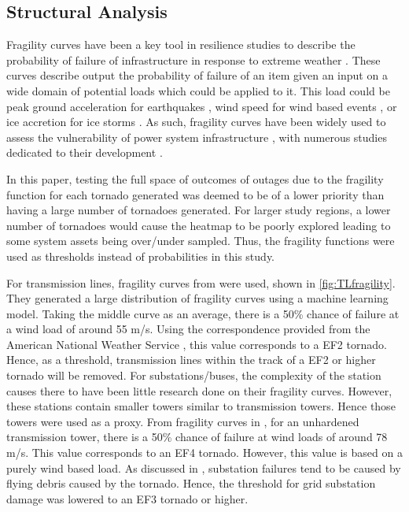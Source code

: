 \documentclass[12pt]{article}
\begin{document}
\subsection{Structural Analysis} \label{FragilityCurve}
Fragility curves have been a key tool in resilience studies to describe the probability of failure of infrastructure in response to extreme weather \cite{serrano2023comprehensive}. These curves describe output the probability of failure of an item given an input on a wide domain of potential loads which could be applied to it. This load could be peak ground acceleration for earthquakes \cite{zekavati2022regional}, wind speed for wind based events \cite{serrano2023comprehensive}, or ice accretion for ice storms \cite{Sheng2023}. As such, fragility curves have been widely used to assess the vulnerability of power system infrastructure \cite{panteli}, with numerous studies dedicated to their development \cite{serrano2023comprehensive}. \par
In this paper, testing the full space of outcomes of outages due to the fragility function for each tornado generated was deemed to be of a lower priority than having a large number of tornadoes generated. For larger study regions, a lower number of tornadoes would cause the heatmap to be poorly explored leading to some system assets being over/under sampled. Thus, the fragility functions were used as thresholds instead of probabilities in this study. \par
For transmission lines, fragility curves from \cite{Watson2024} were used, shown in \ref{fig:TLfragility}. They generated a large distribution of fragility curves using a machine learning model. Taking the middle curve as an average, there is a 50\% chance of failure at a wind load of around 55 m/s. Using the correspondence provided from the American National Weather Service \cite{NWS}, this value corresponds to a EF2 tornado. Hence, as a threshold, transmission lines within the track of a EF2 or higher tornado will be removed. For substations/buses, the complexity of the station causes there to have been little research done on their fragility curves. However, these stations contain smaller towers similar to transmission towers. Hence those towers were used as a proxy. From fragility curves in \cite{dosReis2022}, for an unhardened transmission tower, there is a 50\% chance of failure at wind loads of around 78 m/s. This value corresponds to an EF4 tornado. However, this value is based on a purely wind based load. As discussed in \cite{april}, substation failures tend to be caused by flying debris caused by the tornado. Hence, the threshold for grid substation damage was lowered to an EF3 tornado or higher. \par
\end{document}
